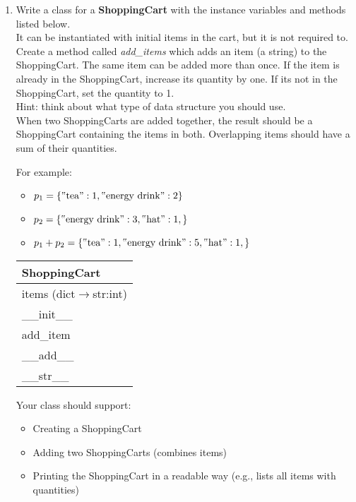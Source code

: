 \documentclass{article}
\newcommand{\csqt}[1]{\text{\reflectbox{''}#1''}}  %
\begin{document}
\begin{enumerate}
	\item
		Write a class for a \textbf{ShoppingCart} with the instance variables and methods listed 
		below.\\
		It can be instantiated with initial items in the cart, but it is not required to.\\
		Create a method called \textit{add\_items} which adds an item (a string) to the 
		ShoppingCart. The same item can be added more than once. If the item is already in the 
		ShoppingCart, increase its quantity by one. If its not in the ShoppingCart, set the 
		quantity to 1.\\ Hint: think about what type of data structure you should use. \\
		When two ShoppingCarts are added together, the result should be a ShoppingCart 
		containing the items in both. Overlapping items should have a sum of their quantities.

		\begin{minipage}[t]{0.65\textwidth}
			For example:
			\begin{itemize}
				\item $p_1 = \{\csqt{tea}:1, \csqt{energy drink}:2 \}$
				\item $p_2 = \{\csqt{energy drink}:3, \csqt{hat}:1, \}$
				\item $p_1 + p_2 = \{\csqt{tea}:1, \csqt{energy drink}:5, \csqt{hat}:1, \}$
			\end{itemize}		
		\end{minipage}
		\hfill
		\begin{minipage}[t]{0.32\textwidth}
			\vspace{0.1em}
			\begin{flushright}
				\begin{tabular}{|l|} \hline
					ShoppingCart \\ \hline
					items (dict$\rightarrow$str:int) \\ \hline
					\_\_init\_\_ \\
					add\_item \\
					\_\_add\_\_ \\
					\_\_str\_\_ \\ \hline
				\end{tabular}
			\end{flushright}
		\end{minipage}
		
		Your class should support:
		\begin{itemize}
			\item Creating a ShoppingCart
			\item Adding two ShoppingCarts (combines items)
			\item Printing the ShoppingCart in a readable way 
				(e.g., lists all items with quantities)
		\end{itemize}
		

\end{enumerate}
\end{document}
